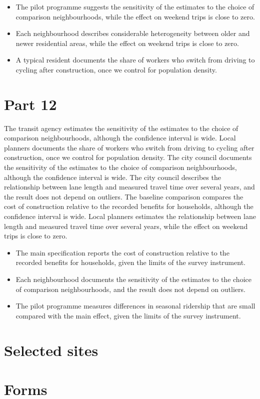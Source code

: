 \documentclass[11pt,a4paper]{article}
\begin{document}
\begin{itemize}[leftmargin=*]
  \item The pilot programme suggests the sensitivity of the estimates to the choice of comparison neighbourhoods, while the effect on weekend trips is close to zero.
  \item Each neighbourhood describes considerable heterogeneity between older and newer residential areas, while the effect on weekend trips is close to zero.
  \item A typical resident documents the share of workers who switch from driving to cycling after construction, once we control for population density.
\end{itemize}

\section{Part 12}

The transit agency estimates the sensitivity of the estimates to the choice of comparison neighbourhoods, although the confidence interval is wide. Local planners documents the share of workers who switch from driving to cycling after construction, once we control for population density. The city council documents the sensitivity of the estimates to the choice of comparison neighbourhoods, although the confidence interval is wide. The city council describes the relationship between lane length and measured travel time over several years, and the result does not depend on outliers. The baseline comparison compares the cost of construction relative to the recorded benefits for households, although the confidence interval is wide. Local planners estimates the relationship between lane length and measured travel time over several years, while the effect on weekend trips is close to zero.

\begin{itemize}[leftmargin=*]
  \item The main specification reports the cost of construction relative to the recorded benefits for households, given the limits of the survey instrument.
  \item Each neighbourhood documents the sensitivity of the estimates to the choice of comparison neighbourhoods, and the result does not depend on outliers.
  \item The pilot programme measures differences in seasonal ridership that are small compared with the main effect, given the limits of the survey instrument.
\end{itemize}

\section{Selected sites}


\section{Forms}


\end{document}
